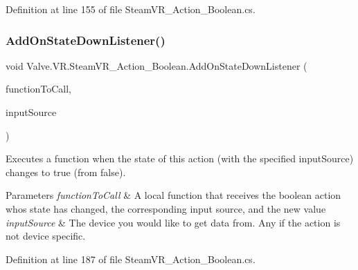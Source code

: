 Definition at line 155 of file Steam\+V\+R\+\_\+\+Action\+\_\+\+Boolean.\+cs.

\mbox{\label{class_valve_1_1_v_r_1_1_steam_v_r___action___boolean_a6c3868c8ed0752981b0814021f26c7cb}} 
\subsubsection{\texorpdfstring{AddOnStateDownListener()}{AddOnStateDownListener()}}
{\footnotesize\ttfamily void Valve.\+V\+R.\+Steam\+V\+R\+\_\+\+Action\+\_\+\+Boolean.\+Add\+On\+State\+Down\+Listener (\begin{DoxyParamCaption}\item[{\mbox{\hyperlink{class_valve_1_1_v_r_1_1_steam_v_r___action___boolean_a529f46e4f0459edb2641bbb382d10614}{State\+Down\+Handler}}}]{function\+To\+Call,  }\item[{\mbox{\hyperlink{namespace_valve_1_1_v_r_a82e5bf501cc3aa155444ee3f0662853f}{Steam\+V\+R\+\_\+\+Input\+\_\+\+Sources}}}]{input\+Source }\end{DoxyParamCaption})}



Executes a function when the state of this action (with the specified input\+Source) changes to true (from false). 


\begin{DoxyParams}{Parameters}
{\em function\+To\+Call} & A local function that receives the boolean action who\textquotesingle{}s state has changed, the corresponding input source, and the new value\\
\hline
{\em input\+Source} & The device you would like to get data from. Any if the action is not device specific.\\
\hline
\end{DoxyParams}


Definition at line 187 of file Steam\+V\+R\+\_\+\+Action\+\_\+\+Boolean.\+cs.

\mbox{\label{class_valve_1_1_v_r_1_1_steam_v_r___action___boolean_a50f2be0b97d5631bb06a7d1d2dad86d1}} 

